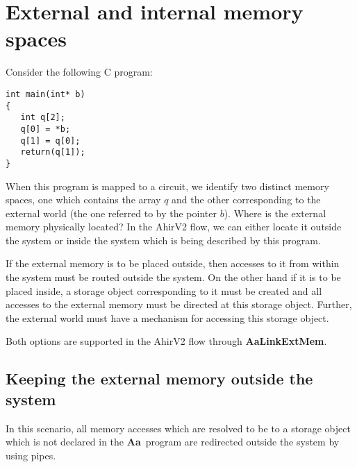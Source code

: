 \documentclass{article}
\newcommand{\Aa}{{\bf Aa}~}
\begin{document}
\section{External and internal memory spaces}

Consider the following C program:
\begin{verbatim}
int main(int* b)
{
   int q[2];
   q[0] = *b;
   q[1] = q[0];
   return(q[1]);
}
\end{verbatim}
When this program is mapped to a circuit, we identify 
two distinct memory spaces, one which contains the
array $q$ and the other corresponding to the 
external world (the one referred to by the pointer $b$).
Where is the external memory physically located?  In 
the AhirV2 flow, we can either locate it outside
the system or inside the system which is being 
described by this program.

If the external memory is to be placed outside, then
accesses to it from within the system must be routed
outside the system.  On the other hand if it is
to be placed inside, a storage object corresponding 
to it must be created and all accesses to the external
memory must be directed at this storage object.
Further, the external world must have a mechanism for
accessing this storage object.

Both options are supported in the AhirV2 flow through
{\bf AaLinkExtMem}.


\subsection{Keeping the external memory outside the system}

In this scenario, all memory accesses which are resolved
to be to a storage object which is not declared in the
\Aa program are redirected outside the system by using
pipes.
\end{document}
